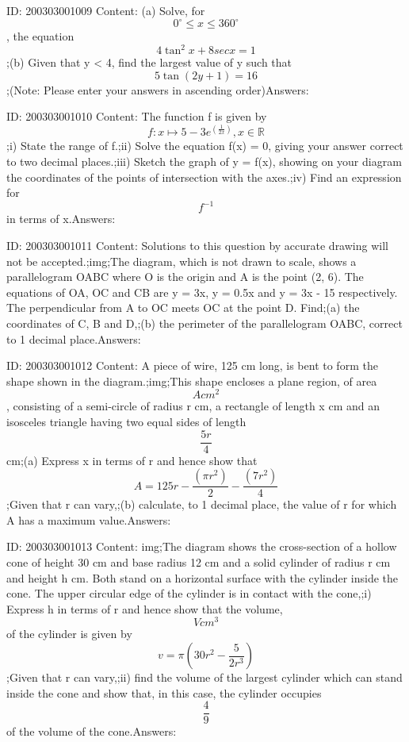 \documentclass{article}
\begin{document}
ID: 200303001009
Content:
(a)	Solve, for $$0^{\circ}\leq x\leq 360^{\circ}$$, the equation $$4\tan ^2x+8secx=1$$;(b) Given that y < 4, find the largest value of y such that $$5 \tan (2y + 1) = 16$$;(Note: Please enter your answers in ascending order)Answers:

ID: 200303001010
Content:
The function f is given by $$f:x \mapsto 5-3e^{(\frac{1}{2x})},x\in \mathbb{R}$$;i) State the range of f.;ii) Solve the equation f(x) = 0, giving your answer correct to two decimal places.;iii) Sketch the graph of y = f(x), showing on your diagram the coordinates of the points of intersection with the axes.;iv) Find an expression for $$f^{-1}$$ in terms of x.Answers:

ID: 200303001011
Content:
Solutions to this question by accurate drawing will not be accepted.;img;The diagram, which is not drawn to scale, shows a parallelogram OABC where O is the origin and A is the point (2, 6). The equations of OA, OC and CB are y = 3x, y = 0.5x and y = 3x - 15 respectively. The perpendicular from A to OC meets OC at the point D. Find;(a)	the coordinates of C, B and D,;(b)	the perimeter of the parallelogram OABC, correct to 1 decimal place.Answers:

ID: 200303001012
Content:
A piece of wire, 125 cm long, is bent to form the shape shown in the diagram.;img;This shape encloses a plane region, of area $$A cm^2$$, consisting of a semi-circle of radius r cm, a rectangle of length x cm and an isosceles triangle having two equal sides of length $$\frac{5r}{4}$$ cm;(a)	Express x in terms of r and hence show that $$A=125r-\frac{(\pi r^2)}{2}-\frac{(7r^2)}{4}$$ ;Given that r can vary,;(b) calculate, to 1 decimal place, the value of r for which A has a maximum value.Answers:

ID: 200303001013
Content:
img;The diagram shows the cross-section of a hollow cone of height 30 cm and base radius 12 cm and a solid cylinder of radius r cm and height h cm. Both stand on a horizontal surface with the cylinder inside the cone. The upper circular edge of the cylinder is in contact with the cone,;i) Express h in terms of r and hence show that the volume, $$V cm^3$$ of the cylinder is given by $$v=\pi(30r^2-\frac{5}{2r^3})$$;Given that r can vary,;ii) find the volume of the largest cylinder which can stand inside the cone and show that, in this case, the cylinder occupies $$\frac{4}{9}$$ of the volume of the cone.Answers:
\end{document}
